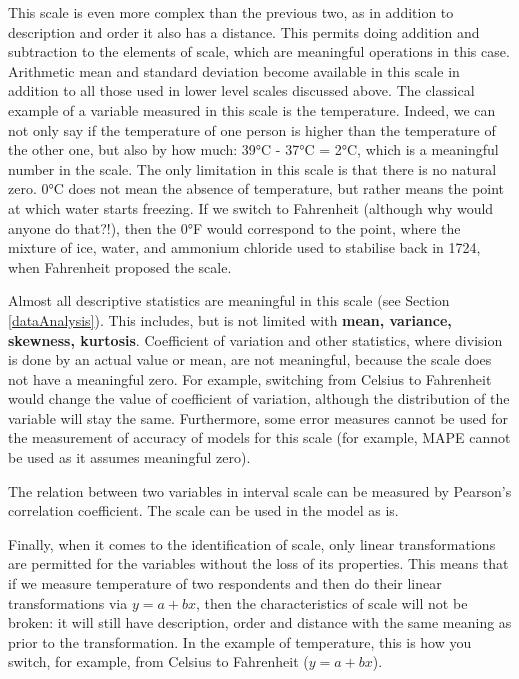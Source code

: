 \documentclass[
]{book}
\theoremstyle{definition}
\theoremstyle{definition}
\theoremstyle{definition}
\theoremstyle{definition}
\theoremstyle{remark}
\begin{document}
This scale is even more complex than the previous two, as in addition to description and order it also has a distance. This permits doing addition and subtraction to the elements of scale, which are meaningful operations in this case. Arithmetic mean and standard deviation become available in this scale in addition to all those used in lower level scales discussed above. The classical example of a variable measured in this scale is the temperature. Indeed, we can not only say if the temperature of one person is higher than the temperature of the other one, but also by how much: 39°C - 37°C = 2°C, which is a meaningful number in the scale. The only limitation in this scale is that there is no natural zero. 0°C does not mean the absence of temperature, but rather means the point at which water starts freezing. If we switch to Fahrenheit (although why would anyone do that?!), then the 0°F would correspond to the point, where the mixture of ice, water, and ammonium chloride used to stabilise back in 1724, when Fahrenheit proposed the scale.

Almost all descriptive statistics are meaningful in this scale (see Section \ref{dataAnalysis}). This includes, but is not limited with \textbf{mean, variance, skewness, kurtosis}. Coefficient of variation and other statistics, where division is done by an actual value or mean, are not meaningful, because the scale does not have a meaningful zero. For example, switching from Celsius to Fahrenheit would change the value of coefficient of variation, although the distribution of the variable will stay the same. Furthermore, some error measures \citep[see Chapter 2 of][]{SvetunkovADAM} cannot be used for the measurement of accuracy of models for this scale (for example, MAPE cannot be used as it assumes meaningful zero).

The relation between two variables in interval scale can be measured by Pearson's correlation coefficient. The scale can be used in the model as is.

Finally, when it comes to the identification of scale, only linear transformations are permitted for the variables without the loss of its properties. This means that if we measure temperature of two respondents and then do their linear transformations via \(y=a+bx\), then the characteristics of scale will not be broken: it will still have description, order and distance with the same meaning as prior to the transformation. In the example of temperature, this is how you switch, for example, from Celsius to Fahrenheit (\(y=a+bx\)).
\end{document}
